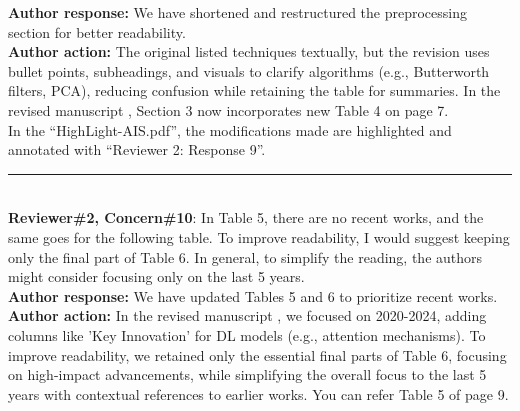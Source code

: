 \documentclass[Afour,sageh,times]{sagej}
\begin{document}
\textbf{Author response:} We have shortened and restructured the preprocessing section for better readability.\\
\textbf{Author action:}  The original listed techniques textually, but the revision uses bullet points, subheadings, and visuals to clarify algorithms (e.g., Butterworth filters, PCA), reducing confusion while retaining the table for summaries. In the revised manuscript , Section 3 now incorporates new Table 4 on page 7.\\

\textcolor{myOrange}{
In the “HighLight-AIS.pdf”, the modifications made are highlighted and annotated with “Reviewer 2: Response 9”.  }\\

\color{gray}\rule{\linewidth}{1pt}\normalcolor\\

\textcolor{myGreen}{ \textbf{Reviewer\#2, Concern\#10}: In Table 5, there are no recent works, and the same goes for the following table. To improve readability, I would suggest keeping only the final part of Table 6. In general, to simplify the reading, the authors might consider focusing only on the last 5 years.}  \\

\textbf{Author response:} We have updated Tables 5 and 6 to prioritize recent works.\\
\textbf{Author action:} In the revised manuscript , we focused on 2020-2024, adding columns like 'Key Innovation' for DL models (e.g., attention mechanisms). To improve readability, we retained only the essential final parts of Table 6, focusing on high-impact advancements, while simplifying the overall focus to the last 5 years with contextual references to earlier works. You can refer Table 5 of page 9.\\
\end{document}
